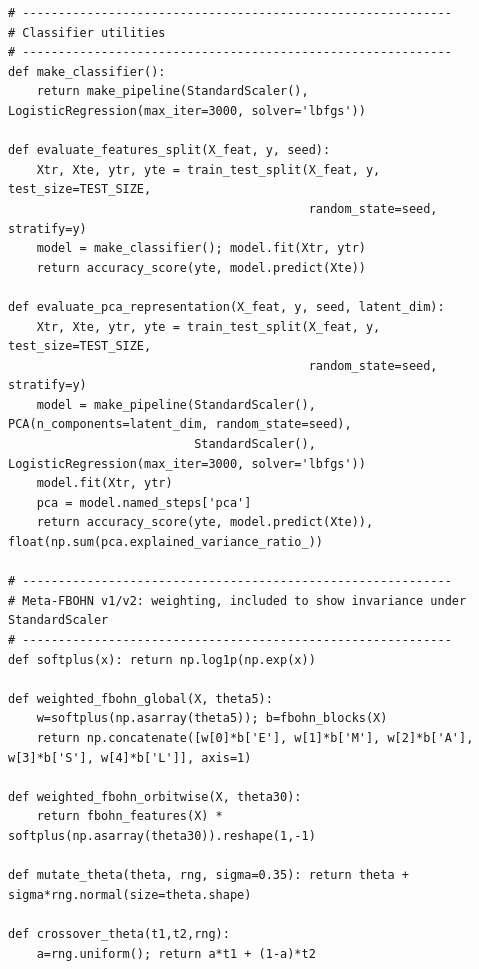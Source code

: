 \documentclass[11pt,a4paper]{report}
\begin{document}
\begin{lstlisting}[caption={Full Python script: RMIG-FBOHN and Meta-FBOHN suite},label={lst:rmig_fbohn_suite}]
# ------------------------------------------------------------
# Classifier utilities
# ------------------------------------------------------------
def make_classifier():
    return make_pipeline(StandardScaler(), LogisticRegression(max_iter=3000, solver='lbfgs'))

def evaluate_features_split(X_feat, y, seed):
    Xtr, Xte, ytr, yte = train_test_split(X_feat, y, test_size=TEST_SIZE,
                                          random_state=seed, stratify=y)
    model = make_classifier(); model.fit(Xtr, ytr)
    return accuracy_score(yte, model.predict(Xte))

def evaluate_pca_representation(X_feat, y, seed, latent_dim):
    Xtr, Xte, ytr, yte = train_test_split(X_feat, y, test_size=TEST_SIZE,
                                          random_state=seed, stratify=y)
    model = make_pipeline(StandardScaler(), PCA(n_components=latent_dim, random_state=seed),
                          StandardScaler(), LogisticRegression(max_iter=3000, solver='lbfgs'))
    model.fit(Xtr, ytr)
    pca = model.named_steps['pca']
    return accuracy_score(yte, model.predict(Xte)), float(np.sum(pca.explained_variance_ratio_))

# ------------------------------------------------------------
# Meta-FBOHN v1/v2: weighting, included to show invariance under StandardScaler
# ------------------------------------------------------------
def softplus(x): return np.log1p(np.exp(x))

def weighted_fbohn_global(X, theta5):
    w=softplus(np.asarray(theta5)); b=fbohn_blocks(X)
    return np.concatenate([w[0]*b['E'], w[1]*b['M'], w[2]*b['A'], w[3]*b['S'], w[4]*b['L']], axis=1)

def weighted_fbohn_orbitwise(X, theta30):
    return fbohn_features(X) * softplus(np.asarray(theta30)).reshape(1,-1)

def mutate_theta(theta, rng, sigma=0.35): return theta + sigma*rng.normal(size=theta.shape)

def crossover_theta(t1,t2,rng):
    a=rng.uniform(); return a*t1 + (1-a)*t2


\end{lstlisting}
\end{document}
